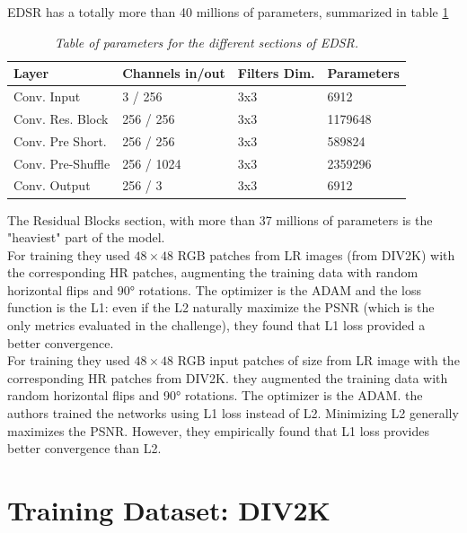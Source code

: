 \documentclass[a4paper, 10pt]{book}
\begin{document}
  EDSR has a totally  more than 40 millions of parameters, summarized in table \ref{tab:edsr-weights}



\begin{table}[H]
\begin{center}
\setlength{\tabcolsep}{14pt}
\begin{tabular}{|l l l l|}
 \hline
 Layer & Channels in/out & Filters Dim. & Parameters \\
 \hline
 Conv. Input       & 3 / 256     & 3x3 & 6912\\ [0.3cm]
 Conv. Res. Block        & 256 / 256   & 3x3 & 1179648\\[0.3cm]
 Conv. Pre Short.  & 256 / 256   & 3x3 & 589824\\[0.3cm]
 Conv. Pre-Shuffle & 256 / 1024  & 3x3 & 2359296 \\[0.3cm]
 Conv. Output      & 256 / 3     & 3x3 & 6912\\
 \hline
\end{tabular}
\end{center}
\caption{\it Table of parameters for the different sections of EDSR.}
\label{tab:edsr-weights}
\end{table}

The Residual Blocks section, with more than 37 millions of parameters is the "heaviest" part of the model.
\\
For training they used $48 \times 48$ RGB patches from LR images (from DIV2K) with the corresponding HR patches, augmenting the training data with random horizontal flips and 90° rotations. 
The optimizer is the ADAM  and the loss function is the L1: even if the L2 naturally maximize the PSNR (which is the only metrics evaluated in the challenge), they found that L1 loss provided a better convergence.
\\
For training they used $48 \times 48$ RGB input patches of size
from LR image with the corresponding HR patches from DIV2K.
they augmented the training data with random horizontal flips
and 90° rotations. 
The optimizer is the ADAM.
the authors trained the networks using L1 loss instead of L2. Minimizing L2 generally maximizes the PSNR. However, they empirically found that L1 loss provides better convergence
than L2. 



\section{Training Dataset: DIV2K}
\end{document}
